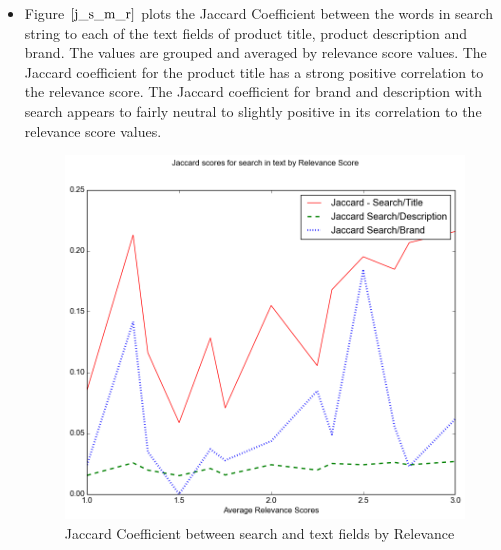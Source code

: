 \documentclass[twoside,12pt]{article}
\begin{document}
\begin{itemize}
\FloatBarrier
\item 
Figure $\eqref{j_s_m_r}$ plots the Jaccard Coefficient between the words in search string to each of the text fields of product title, product description and brand. The values are grouped and averaged by relevance score values. The Jaccard coefficient for the product title has a strong positive correlation to the relevance score. The Jaccard coefficient for brand and description with search appears to fairly neutral to slightly positive in its correlation to the relevance score values.
\FloatBarrier
\begin{figure}[!htbp]
	\centering
	\includegraphics[scale=.43]{DataVisualization/jaccrd_relv_plot.png} 
	\caption{Jaccard Coefficient between search and text fields by Relevance}
	\label{j_s_m_r}
\end{figure}


\end{itemize}
\end{document}
